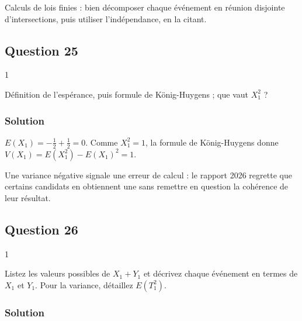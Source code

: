 \documentclass[11pt,a4paper]{article}
\newcommand{\equationajustee}[1]{%
  \sbox{\boiteequation}{$\displaystyle #1$}%
  \ifdim\wd\boiteequation>\linewidth
    \[\resizebox{\linewidth}{!}{\usebox{\boiteequation}}\]%
  \else
    \[#1\]%
  \fi}
\begin{document}
Calculs de lois finies : bien décomposer chaque événement en réunion disjointe d'intersections, puis utiliser l'indépendance, en la citant.

\hypertarget{question-25}{%
\subsection{Question 25}\label{question-25}}

\begin{indication}{1}

Définition de l'espérance, puis formule de König-Huygens ; que vaut \(X_1^2\) ?

\end{indication}

\hypertarget{solution-24}{%
\subsubsection{Solution}\label{solution-24}}

\(E(X_1)=-\frac12+\frac12=0\). Comme \(X_1^2=1\), la formule de König-Huygens donne \(V(X_1)=E(X_1^2)-E(X_1)^2=1\).

\equationajustee{\boxed{\begin{aligned}E(X_1)&=0\\ V(X_1)&=1\end{aligned}}}

\begin{piege}

Une variance négative signale une erreur de calcul : le rapport 2026 regrette que certains candidats en obtiennent une sans remettre en question la cohérence de leur résultat.

\end{piege}

\hypertarget{question-26}{%
\subsection{Question 26}\label{question-26}}

\begin{indication}{1}

Listez les valeurs possibles de \(X_1+Y_1\) et décrivez chaque événement en termes de \(X_1\) et \(Y_1\). Pour la variance, détaillez \(E(T_1^2)\).

\end{indication}

\hypertarget{solution-25}{%
\subsubsection{Solution}\label{solution-25}}
\end{document}
